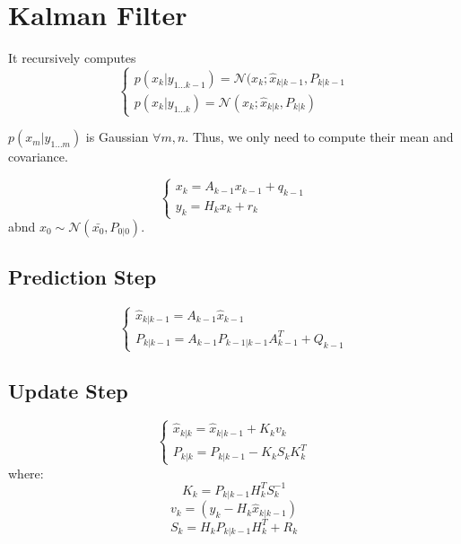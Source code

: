 \section{Kalman Filter}

It recursively computes
\begin{equation}
    \left\{\begin{array}{c}
        p(x_k |y_{1\dots k-1}) = \mathcal{N}(x_k; \hat{x}_{k|k-1}, P_{k|k-1} \\
        p(x_k|y_{1\dots k}) = \mathcal{N}(x_k; \hat{x}_{k|k}, P_{k|k}) 
    \end{array}\right.
\end{equation}

$p(x_m|y_{1\dots m})$ is Gaussian $\forall m, n$. Thus, we only need to compute their mean and covariance.

\begin{equation}
    \left\{\begin{array}{c}
        x_k = A_{k-1} x_{k-1} + q_{k-1} \\
        y_k = H_k x_k + r_k
    \end{array}\right.
\end{equation}
abnd $x_0 \sim \mathcal{N}(\bar{x_0}, P_{0|0})$.

\subsection{Prediction Step}
\begin{equation}
\left\{\begin{array}{c}
        \hat{x}_{k|k-1} = A_{k-1} \hat{x}_{k-1}  \\
        P_{k|k-1} = A_{k-1} P_{k-1|k-1} A_{k-1}^T + Q_{k-1}
    \end{array}\right.
\end{equation}

\subsection{Update Step}
\begin{equation}
    \left\{\begin{array}{c}
        \hat{x}_{k|k} = \hat{x}_{k|k-1} + K_k v_k \\
        P_{k|k} = P_{k|k-1} - K_k S_k K_k^T
    \end{array}\right.
\end{equation}
where:
\begin{equation}
    K_k = P_{k|k-1} H_k^T S_k^{-1}
\end{equation}
\begin{equation}
    v_k = (y_k - H_k \hat{x}_{k|k-1})
\end{equation}
\begin{equation}
    S_k = H_k P_{k|k-1} H_k^T + R_k
\end{equation}

